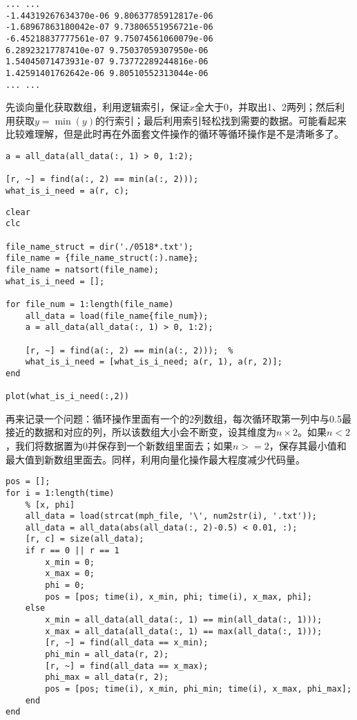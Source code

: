 \begin{verbatim}
... ...
-1.44319267634370e-06 9.80637785912817e-06
-1.68967863180042e-07 9.73806551956721e-06
-6.45218837777561e-07 9.75074561060079e-06
6.28923217787410e-07 9.75037059307950e-06
1.54045071473931e-07 9.73772289244816e-06
1.42591401762642e-06 9.80510552313044e-06
... ...
\end{verbatim}

先谈向量化获取数组，利用逻辑索引，保证$ x $全大于0，并取出1、2两列；然后利用获取$ y=\min(y) $的行索引；最后利用索引轻松找到需要的数据。可能看起来比较难理解，但是此时再在外面套文件操作的循环等循环操作是不是清晰多了。

\begin{verbatim}
a = all_data(all_data(:, 1) > 0, 1:2);

[r, ~] = find(a(:, 2) == min(a(:, 2)));
what_is_i_need = a(r, c);
\end{verbatim}

\begin{verbatim}
clear
clc

file_name_struct = dir('./0518*.txt');
file_name = {file_name_struct(:).name};
file_name = natsort(file_name);
what_is_i_need = [];

for file_num = 1:length(file_name)
    all_data = load(file_name{file_num});
    a = all_data(all_data(:, 1) > 0, 1:2);
    
    [r, ~] = find(a(:, 2) == min(a(:, 2)));  % 
    what_is_i_need = [what_is_i_need; a(r, 1), a(r, 2)];
end

plot(what_is_i_need(:,2))
\end{verbatim}

再来记录一个问题：循环操作里面有一个的2列数组，每次循环取第一列中与0.5最接近的数据和对应的列，所以该数组大小会不断变，设其维度为$ n\times 2 $。如果$ n<2 $，我们将数据置为0并保存到一个新数组里面去；如果$ n>=2 $，保存其最小值和最大值到新数组里面去。同样，利用向量化操作最大程度减少代码量。

\begin{verbatim}
pos = [];
for i = 1:length(time)
    % [x, phi]
    all_data = load(strcat(mph_file, '\', num2str(i), '.txt'));
    all_data = all_data(abs(all_data(:, 2)-0.5) < 0.01, :);
    [r, c] = size(all_data);
    if r == 0 || r == 1
        x_min = 0;
        x_max = 0;
        phi = 0;
        pos = [pos; time(i), x_min, phi; time(i), x_max, phi];
    else
        x_min = all_data(all_data(:, 1) == min(all_data(:, 1)));
        x_max = all_data(all_data(:, 1) == max(all_data(:, 1)));
        [r, ~] = find(all_data == x_min);
        phi_min = all_data(r, 2);
        [r, ~] = find(all_data == x_max);
        phi_max = all_data(r, 2);
        pos = [pos; time(i), x_min, phi_min; time(i), x_max, phi_max];
    end
end
\end{verbatim}

